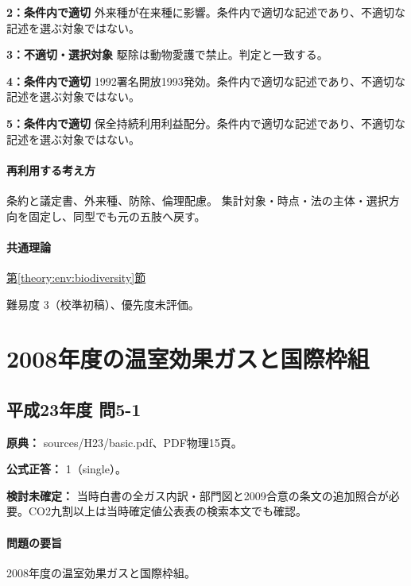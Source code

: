 \noindent\textbf{2：条件内で適切} 外来種が在来種に影響。条件内で適切な記述であり、不適切な記述を選ぶ対象ではない。\par

\noindent\textbf{3：不適切・選択対象} 駆除は動物愛護で禁止。判定と一致する。\par

\noindent\textbf{4：条件内で適切} 1992署名開放1993発効。条件内で適切な記述であり、不適切な記述を選ぶ対象ではない。\par

\noindent\textbf{5：条件内で適切} 保全持続利用利益配分。条件内で適切な記述であり、不適切な記述を選ぶ対象ではない。\par

\paragraph{再利用する考え方} 条約と議定書、外来種、防除、倫理配慮。 集計対象・時点・法の主体・選択方向を固定し、同型でも元の五肢へ戻す。

\paragraph{共通理論} \hyperref[theory:env:biodiversity]{第\ref*{theory:env:biodiversity}節}

\par 難易度 3（校準初稿）、優先度未評価。

\section{2008年度の温室効果ガスと国際枠組}

\subsection{平成23年度 問5-1}
\label{q:h23-reg-basic-5-1}

\noindent\textbf{原典：} sources/H23/basic.pdf、PDF物理15頁。

\textbf{公式正答：} 1（single）。

\par\textbf{検討未確定：} 当時白書の全ガス内訳・部門図と2009合意の条文の追加照合が必要。CO2九割以上は当時確定値公表表の検索本文でも確認。

\paragraph{問題の要旨} 2008年度の温室効果ガスと国際枠組。

